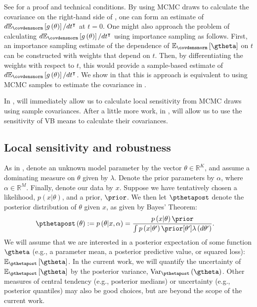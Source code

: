 \documentclass{article}\usepackage[]{graphicx}\usepackage[]{color}
\theoremstyle{plain}
\theoremstyle{definition}
\theoremstyle{plain}
\theoremstyle{plain}
\theoremstyle{plain}
\theoremstyle{plain}
\begin{document}
See  for a proof and technical conditions.
By using MCMC draws to calculate the covariance on the right-hand
side of , one can form
an estimate of $d\mbe_{\covdensnorm}\left[g\left(\theta\right)\right]/dt^{\trans}$
at $t=0$. One might also approach the problem of calculating $d\mbe_{\covdensnorm}\left[g\left(\theta\right)\right]/dt^{\trans}$
using importance sampling \citep[Chapter 9]{owen:2013:mcmcbook} as
follows. First, an importance sampling estimate of the dependence
of $\mbe_{\covdensnorm}\left[\gtheta\right]$ on $t$ can be constructed
with weights that depend on $t$. Then, by differentiating the weights
with respect to $t$, this would provide a sample-based estimate of
$d\mbe_{\covdensnorm}\left[g\left(\theta\right)\right]/dt^{\trans}$.
We show in  that this is
approach is equivalent to using MCMC samples to estimate the covariance
in .

In , 
will immediately allow us to calculate local sensitivity from MCMC
draws using sample covariances. After a little more work, in ,
 will allow us to use the sensitivity of
VB means to calculate their covariances.

\subsection{Local sensitivity and robustness\label{subsec:local_sensitivity}}

As in , denote an unknown model parameter
by the vector $\theta\in\mathbb{R}^{K}$, and assume a dominating
measure on $\theta$ given by $\lambda$. Denote the prior parameters
by $\alpha$, where $\alpha\in\mathbb{R}^{M}$. Finally, denote our
data by $x$. Suppose we have tentatively chosen a likelihood, $p\left(x\vert\theta\right)$,
and a prior, $\prior$. We then let $\pthetapost$ denote the posterior
distribution of $\theta$ given $x$, as given by Bayes' Theorem:
\begin{align*}
\pthetapost\left(\theta\right) & :=p\left(\theta\vert x,\alpha\right)=\frac{p\left(x\vert\theta\right)\prior}{\int p\left(x\vert\theta'\right)\prior[\theta']\lambda\left(d\theta'\right)}.
\end{align*}
We will assume that we are interested in a posterior expectation of
some function $\gtheta$ (e.g., a parameter mean, a posterior predictive
value, or squared loss): $\epgtheta$. In the current work, we will
quantify the uncertainty of $\epgtheta$ by the posterior variance,
$\var_{\pthetapost}\left(\gtheta\right)$. Other measures of central
tendency (e.g., posterior medians) or uncertainty (e.g., posterior
quantiles) may also be good choices, but are beyond the scope of the
current work.
\end{document}
